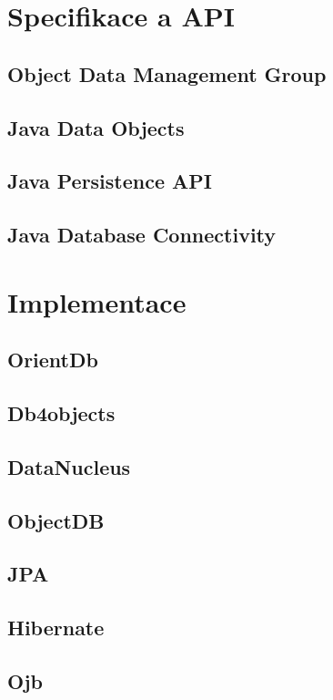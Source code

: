\section{Specifikace a API}
\subsection{Object Data Management Group}
\subsection{Java Data Objects}
\subsection{Java Persistence API}
\subsection{Java Database Connectivity}

\section{Implementace}
\subsection{OrientDb}
\subsection{Db4objects}
\subsection{DataNucleus}
\subsection{ObjectDB}
\subsection{JPA}
\subsection{Hibernate}
\subsection{Ojb}
